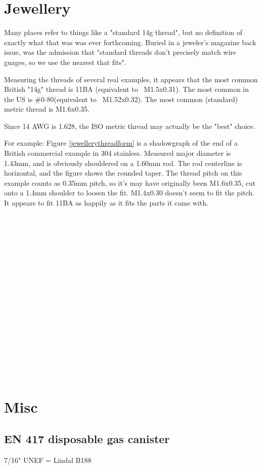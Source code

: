 \section{Jewellery}
Many places refer to things like a "standard 14g thread", but no definition of exactly what that was was ever forthcoming.  Buried in a jeweler's magazine back issue, was the admission that "standard threads don't precisely match wire guages, so we use the nearest that fits".  

Measuring the threads of several real examples, it appears that the most common British "14g" thread is 11BA (equivalent to ~M1.5x0.31).  The most common in the US is \#0-80(equivalent to ~M1.52x0.32).  The most common (standard) metric thread is M1.6x0.35.

Since 14 AWG is 1.628, the ISO metric thread may actually be the "best" choice.

For example: Figure \ref{jewellerythreadform} is a shadowgraph of the end of a British commercial example in 304 stainless.  Measured major diameter is 1.43mm, and is obviously shouldered on a 1.60mm rod. The rod centerline is horizontal, and the figure shows the rounded taper.  The thread pitch on this example counts as 0.35mm pitch, so it's may have originally been M1.6x0.35, cut onto a 1.4mm shoulder to loosen the fit.  M1.4x0.30 doesn't seem to fit the pitch.  It appears to fit 11BA as happily as it fits the parts it came with.
\\ \\ \\ \\ \\ \\ \\ \\ \\ \\ \\ \\ \\ \\ \\ \\ \\ \\               



\clearpage
\section{Misc}
\subsection{EN 417 disposable gas canister}
7/16" UNEF = Lindal B188 
\clearpage
